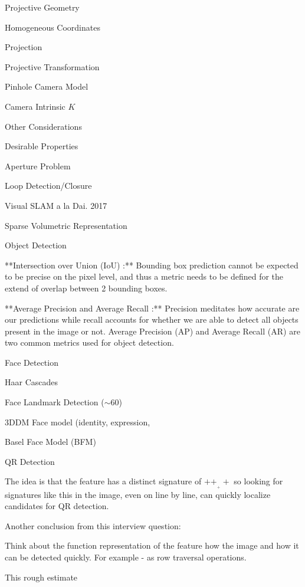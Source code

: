 \begin{section}
\begin{subsubsection}
\begin{subsubsection}
\begin{subsubsection}
\begin{section}{Projective Geometry}
\begin{subsection}{Homogeneous Coordinates}
\begin{subsubsection}
{\begin{subsubsection}{Projection}
\begin{subsubsection}{Projective Transformation}
\begin{subsection}
\begin{subsubsection}
\begin{subsubsection}
\begin{subsubsection}
{\begin{subsubsection}
\begin{subsection}
\begin{subsection} {Pinhole Camera Model}
\begin{subsection} {Camera Intrinsic $K$}
\begin{subsection}
\begin{subsection}
\begin{subsubsection}{Other Considerations}
{\begin{subsection}
\begin{subsubsection}{Desirable Properties}
\begin{section}
\begin{subsection}
\begin{subsection}
\begin{subsection}
\begin{section}
\begin{subsection}
\begin{subsubsection}
\begin{subsubsection}
\begin{subsection}
\begin{section}
\begin{subsection}
\begin{subsubsection}{Aperture Problem}
\begin{subsubsection}
{\begin{section}
\begin{subsubsection}
\begin{subsubsection}
\begin{subsubsection}
\begin{subsection}
\begin{subsection}
\begin{subsection}
\begin{subsection}
\begin{subsection}
\begin{subsection}
\begin{subsection}
\begin{subsubsection}
{\begin{subsubsection}
{\begin{subsubsection}
\begin{section}
\begin{section}
\begin{section}
\begin{subsubsection}
\begin{subsubsection}{Loop Detection/Closure}
\begin{subsubsection}{Visual SLAM a la Dai. 2017}
\begin{subsubsection}{Sparse Volumetric Representation}
\begin{subsection}
\begin{section}{Object Detection}
\begin{subsubsection}
{**Intersection over Union (IoU) :** Bounding box prediction cannot be expected to be precise on the pixel level, and thus a metric needs to be defined for the extend of overlap between 2 bounding boxes.

**Average Precision and Average Recall :** Precision meditates how accurate are our predictions while recall accounts for whether we are able to detect all objects present in the image or not. Average Precision (AP) and Average Recall (AR) are two common metrics used for object detection.

\begin{subsection} Face Detection

Haar Cascades

Face Landmark Detection ($\sim 60$)

3DDM Face model (identity, expression,

Basel Face Model (BFM)

\begin{subsection} QR Detection

The idea is that the feature has a distinct signature of $++__++$ so looking for signatures like this in the image, even on line by line, can quickly localize candidates for QR detection. 

Another conclusion from this interview question: 

Think about the function representation of the feature how the image and how it can be detected quickly. For example - as row traversal operations.

This rough estimate 
\end{subsection}
\end{subsection}}
\end{subsubsection}
\end{section}
\end{subsection}
\end{subsubsection}
\end{subsubsection}
\end{subsubsection}
\end{subsubsection}
\end{section}
\end{section}
\end{section}
\end{subsubsection}}
\end{subsubsection}}
\end{subsubsection}
\end{subsection}
\end{subsection}
\end{subsection}
\end{subsection}
\end{subsection}
\end{subsection}
\end{subsection}
\end{subsubsection}
\end{subsubsection}
\end{subsubsection}
\end{section}}
\end{subsubsection}
\end{subsubsection}
\end{subsection}
\end{section}
\end{subsection}
\end{subsubsection}
\end{subsubsection}
\end{subsection}
\end{section}
\end{subsection}
\end{subsection}
\end{subsection}
\end{section}
\end{subsubsection}
\end{subsection}}
\end{subsubsection}
\end{subsection}
\end{subsection}
\end{subsection}
\end{subsection}
\end{subsection}
\end{subsubsection}}
\end{subsubsection}
\end{subsubsection}
\end{subsubsection}
\end{subsection}
\end{subsubsection}
\end{subsubsection}}
\end{subsubsection}
\end{subsection}
\end{section}
\end{subsubsection}
\end{subsubsection}
\end{subsubsection}
\end{section}
